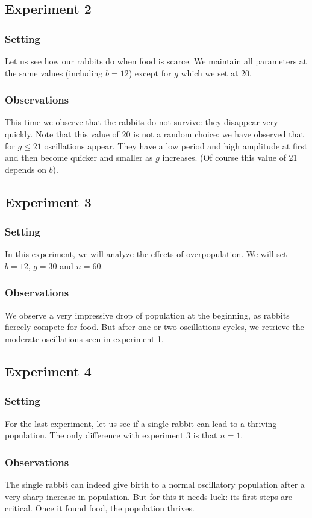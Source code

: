 \documentclass[11pt]{article}
\begin{document}
\subsection{Experiment 2}

\subsubsection{Setting}
Let us see how our rabbits do when food is scarce. We maintain all parameters at the same values (including $b=12$) except for $g$ which we set at 20.

\subsubsection{Observations}
This time we observe that the rabbits do not survive: they disappear very quickly. Note that this value of 20 is not a random choice: we have observed that for $g \leq 21$ oscillations appear. They have a low period and high amplitude at first and then become quicker and smaller as $g$ increases. (Of course this value of 21 depends on $b$). 


\subsection{Experiment 3}

\subsubsection{Setting}
In this experiment, we will analyze the effects of overpopulation. We will set $b=12$, $g=30$ and $n=60$.

\subsubsection{Observations}
We observe a very impressive drop of population at the beginning, as rabbits fiercely compete for food. But after one or two oscillations cycles, we retrieve the moderate oscillations seen in experiment 1.

\subsection{Experiment 4}
\subsubsection{Setting}
For the last experiment, let us see if a single rabbit can lead to a thriving population. The only difference with experiment 3 is that $n=1$.

\subsubsection{Observations}
The single rabbit can indeed give birth to a normal oscillatory population after a very sharp increase in population. But for this it needs luck: its first steps are critical. Once it found food, the population thrives.
\end{document}
